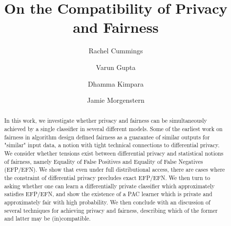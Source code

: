 \documentclass[format = sigconf]{acmart}
\newcommand{\1}{\mathbbm{1}}
\theoremstyle{definition}
\begin{document}
\title{On the Compatibility of Privacy and Fairness}
\author{Rachel Cummings\footnotemark[1] \and Varun Gupta\footnotemark[1] \and Dhamma Kimpara\footnotemark[1] \and Jamie Morgenstern\footnotemark[1]}

\begin{abstract}
  In this work, we investigate whether privacy and fairness can be
  simultaneously achieved by a single classifier in several different
  models. Some of the earliest work on fairness in algorithm design
  defined fairness as a guarantee of similar outputs for "similar"
  input data, a notion with tight technical connections to
  differential privacy. We consider whether tensions exist between
  differential privacy and statistical notions of fairness, namely
  Equality of False Positives and Equality of False Negatives
  (EFP/EFN). We show that even under full distributional access, there
  are cases where the constraint of differential privacy precludes
  exact EFP/EFN. We then turn to asking whether one can learn a
  differentially private classifier which approximately satisfies
  EFP/EFN, and show the existence of a PAC learner which is private
  and approximately fair with high probability. We then conclude with
  an discussion of several techniques for achieving privacy and
  fairness, describing which of the former and latter may be
  (in)compatible.
\end{abstract}

\maketitle

\renewcommand{\thefootnote}{\fnsymbol{footnote}}

\renewcommand{\thefootnote}{\arabic{footnote}}











%



\end{document}
